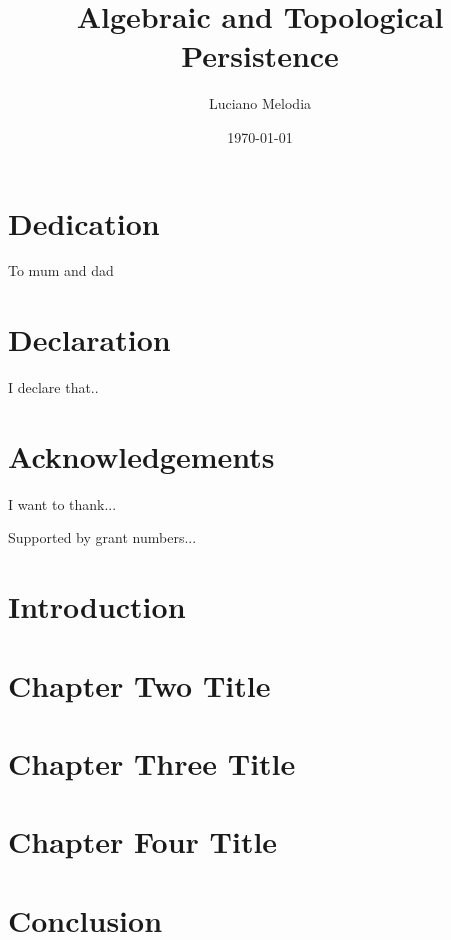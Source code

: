 \documentclass[b5paper, 11pt, twoside]{report}
\title{Algebraic and Topological Persistence}
\author{Luciano Melodia}
\date{\today}
\begin{document}



\chapter*{Dedication}

To mum and dad

\chapter*{Declaration}

I declare that..

\chapter*{Acknowledgements}

I want to thank...

Supported by grant numbers...

\newpage
\tableofcontents

\newpage
\listoffigures
\listoftables

\singlespacing
\chapter{Introduction}


\chapter{Chapter Two Title}


\chapter{Chapter Three Title}


\chapter{Chapter Four Title}


\chapter{Conclusion}


\singlespacing
\printbibliography
\end{document}
